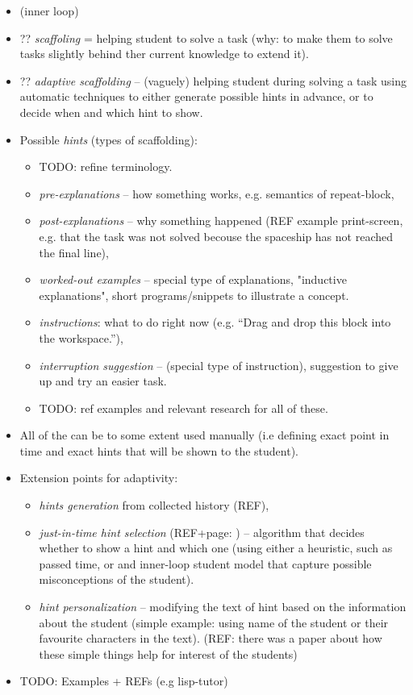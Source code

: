\begin{itemize}
\item (inner loop)
\item ?? \emph{scaffoling} = helping student to solve a task
  (why: to make them to solve tasks slightly behind ther current knowledge to extend it).
\item ?? \emph{adaptive scaffolding} -- (vaguely) helping student during solving a task
  using automatic techniques to either generate possible hints in advance,
  or to decide when and which hint to show.

\item Possible \emph{hints} (types of scaffolding):
\begin{itemize}
\item TODO: refine terminology.
\item \emph{pre-explanations} --
  how something works, e.g. semantics of repeat-block,
\item \emph{post-explanations} --
  why something happened (REF example print-screen, e.g. that the task was not
  solved becouse the spaceship has not reached the final line),
\item \emph{worked-out examples} --
  special type of explanations, "inductive explanations",
  short programs/snippets to illustrate a concept.
\item \emph{instructions}: what to do right now
  (e.g. ``Drag and drop this block into the workspace.''),
\item \emph{interruption suggestion} --
  (special type of instruction),
  suggestion to give up and try an easier task.
\item TODO: ref examples and relevant research for all of these.
\end{itemize}

\item All of the can be to some extent used manually (i.e defining exact point in time
  and exact hints that will be shown to the student).
\item Extension points for adaptivity:
\begin{itemize}
\item \emph{hints generation} from collected history (REF),
\item \emph{just-in-time hint selection} (REF+page: \cite{student-models-review-2012})
  -- algorithm that decides whether to show a hint and which one
  (using either a heuristic, such as passed time, or and inner-loop student model that capture
  possible misconceptions of the student).
\item \emph{hint personalization} -- modifying the text of hint based on the information
  about the student
  (simple example: using name of the student or their favourite characters in the text).
  (REF: there was a paper about how these simple things help for interest of the students)
\end{itemize}
\item TODO: Examples + REFs (e.g lisp-tutor)


\end{itemize}

